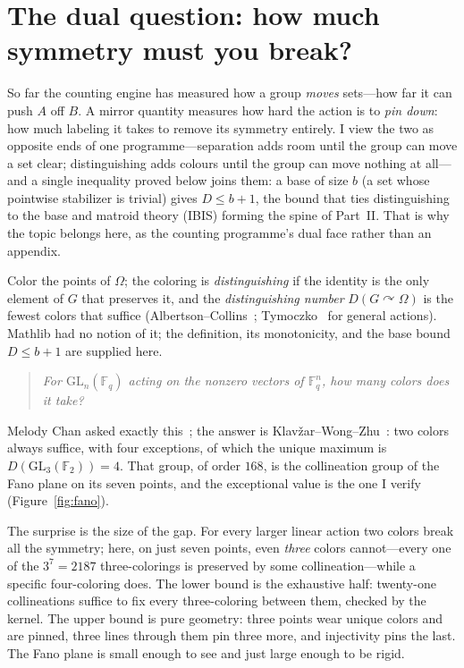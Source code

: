 \documentclass[11pt]{article}
\newcommand{\GL}{\mathrm{GL}}
\begin{document}
\section{The dual question: how much symmetry must you break?}
\label{sec:distinguishing}

So far the counting engine has measured how a group \emph{moves} sets---how far it
can push $A$ off $B$. A mirror quantity measures how hard the action is to
\emph{pin down}: how much labeling it takes to remove its symmetry entirely. I
view the two as opposite ends of one programme---separation adds room until the
group can move a set clear; distinguishing adds colours until the group can move
nothing at all---and a single inequality proved below joins them: a base of size $b$ (a set
whose pointwise stabilizer is trivial) gives $D\le b+1$, the bound that ties
distinguishing to the base and matroid theory (IBIS) forming the spine of Part~II.
That is why the topic belongs here, as the counting programme's dual face rather
than an appendix.

Color the points of $\Omega$; the coloring is \emph{distinguishing} if the
identity is the only element of $G$ that preserves it, and the \emph{distinguishing
number} $D(G\curvearrowright\Omega)$ is the fewest colors that suffice
(Albertson--Collins~\cite{AlbertsonCollins1996}; Tymoczko~\cite{Tymoczko2004} for
general actions). Mathlib had no notion of it; the definition, its monotonicity,
and the base bound $D\le b+1$ are supplied here.

\begin{quote}\itshape
  For $\GL_n(\mathbb{F}_q)$ acting on the nonzero vectors of $\mathbb{F}_q^n$,
  how many colors does it take?
\end{quote}
Melody Chan asked exactly this~\cite{Chan2006}; the answer is
Klavžar--Wong--Zhu~\cite{KWZ2006}: two colors always suffice, with four
exceptions, of which the unique maximum is $D(\GL_3(\mathbb{F}_2))=4$. That group,
of order $168$, is the collineation group of the Fano plane on its seven points,
and the exceptional value is the one I verify (Figure~\ref{fig:fano}).

The surprise is the size of the gap. For every larger linear action two colors
break all the symmetry; here, on just seven points, even \emph{three} colors
cannot---every one of the $3^7=2187$ three-colorings is preserved by some
collineation---while a specific four-coloring does. The lower bound is the
exhaustive half: twenty-one collineations suffice to fix every three-coloring
between them, checked by the kernel. The upper bound is pure geometry: three
points wear unique colors and are pinned, three lines through them pin three more,
and injectivity pins the last. The Fano plane is small enough to see and just
large enough to be rigid.
\end{document}
